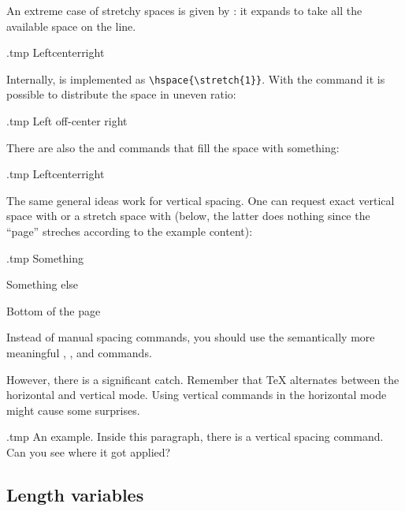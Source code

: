 An extreme case of stretchy spaces is given by :
it expands to take all the available space on the line.
%
\begin{VerbatimOut}{\jobname.tmp}
Left\hfill center\hfill right
\end{VerbatimOut}
\ShowExampleBelow
%
Internally,  is implemented as \verb|\hspace{\stretch{1}}|.
With the  command it is possible to distribute the space in uneven ratio:
%
\begin{VerbatimOut}{\jobname.tmp}
Left off-center right
\end{VerbatimOut}
\ShowExampleBelow

There are also the  and  commands
that fill the space with something:
%
\begin{VerbatimOut}{\jobname.tmp}
Left\hrulefill center\dotfill right
\end{VerbatimOut}
\ShowExampleBelow

The same general ideas work for vertical spacing.
One can request exact vertical space with  or a stretch space with 
(below, the latter does nothing since the ``page'' streches according to the example content):
%
\begin{VerbatimOut}{\jobname.tmp}
Something

\vspace{1cm}

Something else

\vfill

Bottom of the page
\end{VerbatimOut}
\ShowExample

Instead of manual spacing commands,
you should use the semantically more meaningful
, , and  commands.

However, there is a significant catch.
Remember that \TeX{} alternates between the horizontal and vertical mode.
Using vertical commands in the horizontal mode might cause some surprises.
%
\begin{VerbatimOut}{\jobname.tmp}
An example.
\bigskip
Inside this paragraph,
there is a vertical spacing command.
Can you see where it got applied?
\end{VerbatimOut}
\ShowExample


%
%
\subsection{Length variables}\label{sec:lengths}

